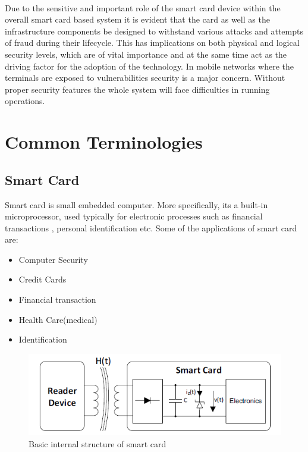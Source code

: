\documentclass[12pt]{article}
\begin{document}
\paragraph{}
Due to the sensitive and important role of the smart
card device within the overall smart card based system
it is evident that the card as well as the infrastructure
components be designed to withstand various attacks
and attempts of fraud during their lifecycle. This has
implications on both physical and logical security
levels, which are of vital importance and at the same
time act as the driving factor for the adoption of the
technology. In mobile networks where the terminals are exposed to vulnerabilities security is a major concern. Without proper security features the whole system will face difficulties in running operations.


\section{Common Terminologies}
\subsection{Smart Card}
Smart card is  small embedded computer. More specifically, its a built-in microprocessor, used typically for electronic processes such as financial transactions , personal identification etc. Some of the applications of smart card are:
\begin{itemize}
\item Computer Security
\item Credit Cards
\item Financial transaction
\item Health Care(medical)
\item Identification

\end{itemize}

\begin{figure}[!t]

\centering
    \includegraphics[scale=0.8]{smart_card_internal}
    \caption{Basic internal structure of smart card}
    \label{smart_card}
\label{adhoc}

\end{figure}
\end{document}
